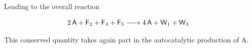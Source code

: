 \documentclass{article}
\begin{document}
Leading to the overall reaction

\begin{equation}
		\begin{split}
  \ce{2\textsf{A} + \textsf{F}_2 + \textsf{F}_4 + \textsf{F}_5 & -> 4\textsf{A} + \textsf{W}_1 + \textsf{W}_3}
		\end{split} 
\end{equation}

This conserved quantity takes again part in the autocatalytic production of A.

\printbibliography
\end{document}
